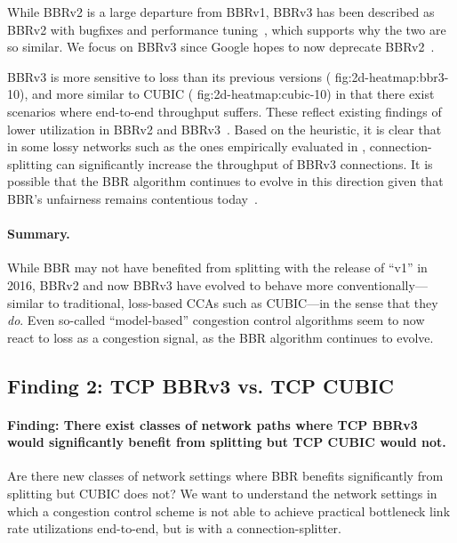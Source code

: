 While BBRv2 is a large departure from BBRv1, BBRv3 has been described as BBRv2
with bugfixes and performance tuning~\cite{cardwell2024bbrv3-ietf119}, which
supports why the two are so similar. We focus on BBRv3 since Google hopes to
now deprecate BBRv2~\cite{cardwell2024bbrv3-ietf119}.

BBRv3 is more sensitive to loss than its previous versions (\Cref
{fig:2d-heatmap:bbr3-10}), and more similar to CUBIC (\Cref
{fig:2d-heatmap:cubic-10}) in that there exist scenarios where end-to-end
throughput suffers.
These reflect existing findings of lower utilization in BBRv2 and BBRv3~\cite
{datta2023replication,song2021understanding,zeynali2024promises}.
Based on the heuristic, it is clear that in some lossy networks
such as the ones empirically evaluated in ,
connection-splitting
can significantly increase the throughput of BBRv3 connections.
It is possible that the BBR algorithm continues to evolve in this direction
given that BBR's unfairness remains contentious today~\cite
{datta2023replication,zeynali2024promises}.

\paragraph{Summary.}

While BBR may not have benefited from splitting with the release of ``v1'' in 2016, BBRv2 and
now BBRv3 have evolved to behave more conventionally---similar to traditional,
loss-based CCAs such as CUBIC---in the sense that they \textit{do}. Even
so-called ``model-based'' congestion control algorithms seem to now react to
loss as a congestion signal, as the BBR algorithm continues to evolve.

\subsection{Finding 2: TCP BBRv3 vs. TCP CUBIC}
\label{sec:splitting:results:finding2}

\paragraph{Finding: There exist classes of network paths where TCP BBRv3 would
 significantly benefit from splitting but TCP CUBIC would not.}

Are there new classes of network settings where BBR benefits significantly from
splitting but CUBIC does not? We want to understand the network settings in
which a congestion control scheme is not able to achieve practical bottleneck
link rate utilizations end-to-end, but is with a connection-splitter.


